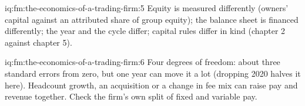 \begin{solution}{iq:fm:the-economics-of-a-trading-firm:5}
Equity is measured differently (owners' capital against an attributed share of group equity); the balance sheet is financed differently; the
year and the cycle differ; capital rules differ in kind (chapter 2 against chapter 5).
\end{solution}

\begin{solution}{iq:fm:the-economics-of-a-trading-firm:6}
Four degrees of freedom: about three standard errors from zero, but one year can move it a lot (dropping 2020 halves it here). Headcount growth, an
acquisition or a change in fee mix can raise pay and revenue together. Check the firm's own split of fixed and variable pay.
\end{solution}
